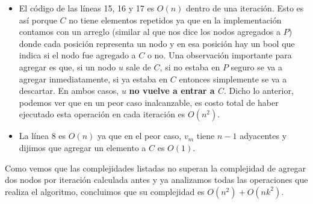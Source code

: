 \documentclass[a4paper]{article}
\begin{document}
\begin{itemize}
\item El código de las líneas 15, 16 y 17 es $O(n)$ dentro de una iteración. Esto es así porque $C$ no tiene elementos repetidos ya que en la implementación contamos con un arreglo (similar al que nos dice los nodos agregados a $P$) donde cada posición representa un nodo y en esa posición hay un bool que indica si el nodo fue agregado a $C$ o no. Una observación importante para agregar es que, si un nodo $u$ sale de $C$, si no estaba en $P$ seguro se va a agregar inmediatamente, si ya estaba en $C$ entonces simplemente se va a descartar. En ambos casos, $u$ \textbf{no vuelve a entrar a $C$}. Dicho lo anterior, podemos ver que en un peor caso inalcanzable, es costo total de haber ejecutado esta operación en cada iteración es $O(n^2)$.
\item La línea 8 es $O(n)$ ya que en el peor caso, $v_m$ tiene $n - 1$ adyacentes y dijimos que agregar un elemento a $C$ es $O(1)$.
\end{itemize}

\vspace{0.3cm}
Como vemos que las complejidades listadas no superan la complejidad de agregar dos nodos por iteración calculada antes y ya analizamos todas las operaciones que realiza el algoritmo, concluimos que su complejidad es $O(n^2) + O(nk^2)$.
\end{document}
